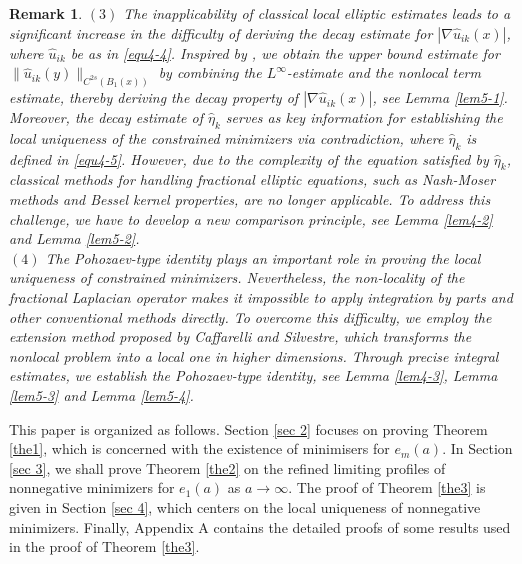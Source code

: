 \documentclass[reqno, 11pt]{amsart} %
\numberwithin{equation}{section}
\newtheorem{remark}[theorem]{Remark}
\begin{document}
\begin{remark}
	$(3)$ The inapplicability of classical local elliptic estimates leads to a significant increase in the difficulty of deriving the decay estimate for $|\nabla\hat{u}_{ik}(x)|$, where $\hat{u}_{ik}$ be as in \eqref{equ4-4}. Inspired by \cite[Theorem 12.2.4]{C}, we obtain the upper bound estimate for $\|\hat{u}_{ik}(y)\|_{C^{2s}(B_{1}(x))}$ by combining the $L^{\infty}$-estimate and the nonlocal term estimate, thereby deriving the decay property of $|\nabla\hat{u}_{ik}(x)|$, see Lemma \ref{lem5-1}. Moreover, the decay estimate of $\hat{\eta}_{k}$ serves as key information for establishing the local uniqueness of the constrained minimizers via contradiction, where $\hat{\eta}_{k}$ is defined in \eqref{equ4-5}. However, due to the complexity of the equation satisfied by $\hat{\eta}_{k}$, classical methods for handling fractional elliptic equations, such as Nash-Moser methods and Bessel kernel properties, are no longer applicable. To address this challenge, we have to develop a new comparison principle, see Lemma \ref{lem4-2} and Lemma \ref{lem5-2}.\\
	$(4)$ The Pohozaev-type identity plays an important role in proving the local uniqueness of constrained minimizers. Nevertheless, the non-locality of the fractional Laplacian operator makes it impossible to apply integration by parts and other conventional methods directly. To overcome this difficulty, we employ the extension method proposed by Caffarelli and Silvestre\cite{CC}, which transforms the nonlocal problem into a local one in higher dimensions. Through precise integral estimates, we establish the Pohozaev-type identity, see Lemma \ref{lem4-3}, Lemma \ref{lem5-3} and Lemma \ref{lem5-4}.
		\end{remark}
	
	
	This paper is organized as follows. Section \ref{sec 2} focuses on proving Theorem \ref{the1}, which is concerned with the existence of minimisers for $e_{m}(a)$. In Section \ref{sec 3}, we shall prove Theorem \ref{the2} on the refined limiting profiles of nonnegative minimizers	for $e_{1}(a)$ as $a\rightarrow\infty$.  The proof of Theorem \ref{the3} is given in Section \ref{sec 4}, which centers on the local uniqueness of nonnegative minimizers. Finally, Appendix A contains the detailed proofs of some results used in the proof of Theorem \ref{the3}.
	
	
	
	
	
	
	
	
	
	
	
\end{document}
